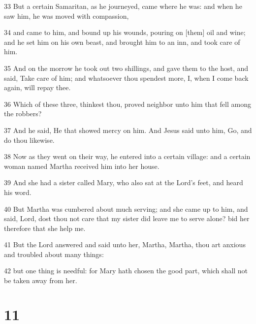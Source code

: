 \par 33 But a certain Samaritan, as he journeyed, came where he was: and when he saw him, he was moved with compassion,
\par 34 and came to him, and bound up his wounds, pouring on [them] oil and wine; and he set him on his own beast, and brought him to an inn, and took care of him.
\par 35 And on the morrow he took out two shillings, and gave them to the host, and said, Take care of him; and whatsoever thou spendest more, I, when I come back again, will repay thee.
\par 36 Which of these three, thinkest thou, proved neighbor unto him that fell among the robbers?
\par 37 And he said, He that showed mercy on him. And Jesus said unto him, Go, and do thou likewise.
\par 38 Now as they went on their way, he entered into a certain village: and a certain woman named Martha received him into her house.
\par 39 And she had a sister called Mary, who also sat at the Lord's feet, and heard his word.
\par 40 But Martha was cumbered about much serving; and she came up to him, and said, Lord, dost thou not care that my sister did leave me to serve alone? bid her therefore that she help me.
\par 41 But the Lord answered and said unto her, Martha, Martha, thou art anxious and troubled about many things:
\par 42 but one thing is needful: for Mary hath chosen the good part, which shall not be taken away from her.

\chapter{11}


